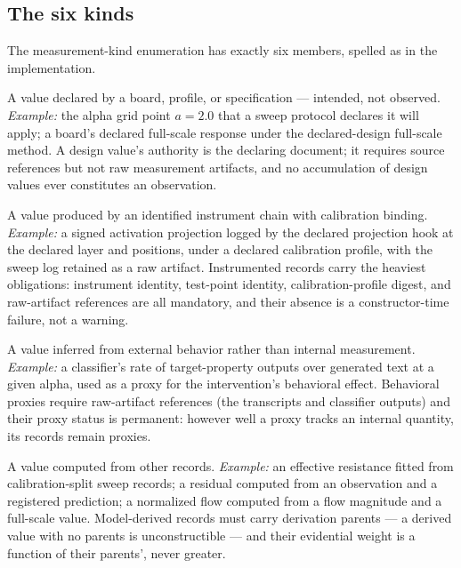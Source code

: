 \subsection{The six kinds}\label{ch03:measurement:kinds}

The measurement-kind enumeration has exactly six members, spelled as in the implementation.

\begin{definition}\label{ch03:mk:design}
A value declared by a board, profile, or specification --- intended, not observed. \emph{Example:} the alpha grid point $a = 2.0$ that a sweep protocol declares it will apply; a board's declared full-scale response under the declared-design full-scale method. A design value's authority is the declaring document; it requires source references but not raw measurement artifacts, and no accumulation of design values ever constitutes an observation.
\end{definition}

\begin{definition}\label{ch03:mk:instrumented}
A value produced by an identified instrument chain with calibration binding. \emph{Example:} a signed activation projection logged by the declared projection hook at the declared layer and positions, under a declared calibration profile, with the sweep log retained as a raw artifact. Instrumented records carry the heaviest obligations: instrument identity, test-point identity, calibration-profile digest, and raw-artifact references are all mandatory, and their absence is a constructor-time failure, not a warning.
\end{definition}

\begin{definition}\label{ch03:mk:proxy}
A value inferred from external behavior rather than internal measurement. \emph{Example:} a classifier's rate of target-property outputs over generated text at a given alpha, used as a proxy for the intervention's behavioral effect. Behavioral proxies require raw-artifact references (the transcripts and classifier outputs) and their proxy status is permanent: however well a proxy tracks an internal quantity, its records remain proxies.
\end{definition}

\begin{definition}\label{ch03:mk:derived}
A value computed from other records. \emph{Example:} an effective resistance fitted from calibration-split sweep records; a residual computed from an observation and a registered prediction; a normalized flow computed from a flow magnitude and a full-scale value. Model-derived records must carry derivation parents --- a derived value with no parents is unconstructible --- and their evidential weight is a function of their parents', never greater.
\end{definition}

